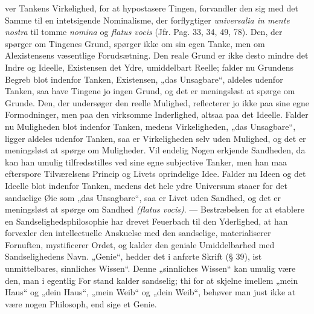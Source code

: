 \documentclass[12pt]{book}
\newcommand{\opage}[1]{\marginnote{\footnotesize\textit{[#1]}}}
\begin{document}
%
ver Tankens Virkelighed, for at hypostasere Tingen, forvandler den sig med det Samme til
en intetsigende Nominalisme, der forflygtiger \textit{universalia in mente nostra} til
tomme \textit{nomina} og \textit{flatus vocis} (Jfr. Pag. 33, 34, 49, 78). Den, der
spørger om Tingenes Grund, spørger ikke om sin egen Tanke, men om Alexistensens
væsentlige Forudsætning. Den reale Grund er ikke desto mindre det Indre og Ideelle,
Existensen det Ydre, umiddelbart Reelle; falder nu Grundens Begreb blot indenfor Tanken,
Existensen, „das Unsagbare“, aldeles udenfor Tanken, saa have Tingene jo ingen Grund, og
det er meningsløst at spørge om Grunde. Den, der undersøger den reelle Mulighed,
reflecterer jo ikke paa sine egne Formodninger, men paa den virksomme Inderlighed, altsaa
paa det Ideelle. Falder nu Muligheden blot indenfor Tanken, medens Virkeligheden, „das
Unsagbare“, ligger aldeles udenfor Tanken, saa er Virkeligheden selv uden Mulighed, og det
er meningsløst at spørge om Muligheder. Vil endelig Nogen erkjende Sandheden, da kan han
umulig tilfredsstilles ved sine egne subjective Tanker, men han maa efterspore
Tilværelsens Princip og Livets oprindelige Idee. Falder nu Ideen og det Ideelle blot
indenfor Tanken, medens det hele ydre Universum staaer for det sandselige Øie som „das
Unsagbare“, saa er Livet uden Sandhed, og det er meningsløst at spørge om Sandhed
\textit{(flatus vocis)}. --- Bestræbelsen for at etablere en Sandselighedsphilosophie har
drevet Feuerbach til den Yderlighed, at han forvexler den intellectuelle Anskuelse med den
sandselige, materialiserer Fornuften, mystificerer Ordet, og kalder den geniale
Umiddelbarhed med Sandselighedens Navn. „Genie“, hedder det i anførte Skrift
(§ 39), ist unmittelbares, sinnliches Wissen“. Denne „sinnliches Wissen“ kan umulig være
den, man i egentlig For%
\opage{196}%
stand kalder sandselig; thi for at skjelne imellem „mein Haus“ og „dein Haus“, „mein
Weib“ og „dein Weib“, behøver man just ikke at være nogen Philosoph, end sige et Genie.
\end{document}
